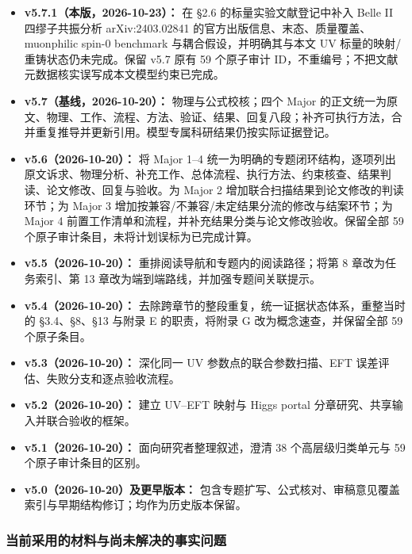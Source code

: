 \documentclass[
]{article}
\begin{document}
\begin{itemize}
\item
  \textbf{v5.7.1（本版，2026-10-23）：} 在 §2.6 的标量实验文献登记中补入
  Belle II 四缪子共振分析 arXiv:2403.02841
  的官方出版信息、末态、质量覆盖、muonphilic spin-0 benchmark
  与耦合假设，并明确其与本文 UV 标量的映射/重铸状态仍未完成。保留 v5.7
  原有 59 个原子审计
  ID，不重编号；不把文献元数据核实误写成本文模型约束已完成。
\item
  \textbf{v5.7（基线，2026-10-20）：} 物理与公式校核；四个 Major
  的正文统一为原文、物理、工作、流程、方法、验证、结果、回复八段；补齐可执行方法，合并重复推导并更新引用。模型专属科研结果仍按实际证据登记。
\item
  \textbf{v5.6（2026-10-20）：} 将 Major 1--4
  统一为明确的专题闭环结构，逐项列出原文诉求、物理分析、补充工作、总体流程、执行方法、约束核查、结果判读、论文修改、回复与验收。为
  Major 2 增加联合扫描结果到论文修改的判读环节；为 Major 3
  增加按兼容/不兼容/未定结果分流的修改与结案环节；为 Major 4
  前置工作清单和流程，并补充结果分类与论文修改验收。保留全部 59
  个原子审计条目，未将计划误标为已完成计算。
\item
  \textbf{v5.5（2026-10-20）：} 重排阅读导航和专题内的阅读路径；将第 8
  章改为任务索引、第 13 章改为端到端路线，并加强专题间关联提示。
\item
  \textbf{v5.4（2026-10-20）：}
  去除跨章节的整段重复，统一证据状态体系，重整当时的 §3.4、§8、§13
  与附录 E 的职责，将附录 G 改为概念速查，并保留全部 59 个原子条目。
\item
  \textbf{v5.3（2026-10-20）：} 深化同一 UV 参数点的联合参数扫描、EFT
  误差评估、失败分支和逐点验收流程。
\item
  \textbf{v5.2（2026-10-20）：} 建立 UV--EFT 映射与 Higgs portal
  分章研究、共享输入并联合验收的框架。
\item
  \textbf{v5.1（2026-10-20）：} 面向研究者整理叙述，澄清 38
  个高层级归类单元与 59 个原子审计条目的区别。
\item
  \textbf{v5.0（2026-10-20）及更早版本：}
  包含专题扩写、公式核对、审稿意见覆盖索引与早期结构修订；均作为历史版本保留。
\end{itemize}

\subsubsection{当前采用的材料与尚未解决的事实问题}\label{ux5f53ux524dux91c7ux7528ux7684ux6750ux6599ux4e0eux5c1aux672aux89e3ux51b3ux7684ux4e8bux5b9eux95eeux9898}
\end{document}
